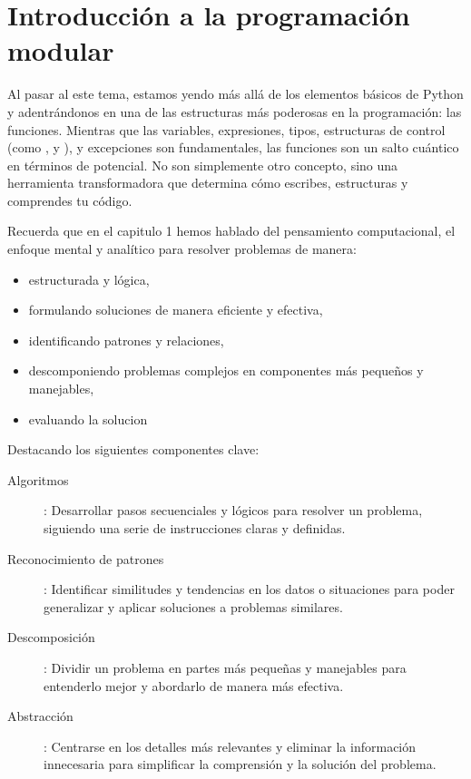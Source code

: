
\section{Introducción a la programación modular}\label{introfunction}

Al pasar al este tema, estamos yendo más allá de los elementos básicos de Python y adentrándonos en una de las estructuras más poderosas en la programación: las funciones. Mientras que las variables, expresiones, tipos, estructuras de control (como ,  y ), y excepciones son fundamentales, las funciones son un salto cuántico en términos de potencial. No son simplemente otro concepto, sino una herramienta transformadora que determina cómo escribes, estructuras y comprendes tu código.

Recuerda que en el capitulo 1 hemos hablado del pensamiento computacional, el enfoque mental y analítico para resolver problemas de manera:

\begin{itemize}
\item estructurada y lógica, 
\item formulando soluciones de manera eficiente y efectiva,
\item identificando patrones y relaciones, 
\item descomponiendo problemas complejos en componentes más pequeños y manejables,
\item evaluando la solucion
\end{itemize}

Destacando los siguientes componentes clave:

\begin{description}
\item[Algoritmos]: Desarrollar pasos secuenciales y lógicos para resolver un problema, siguiendo una serie de instrucciones claras y definidas.

\item[Reconocimiento de patrones]: Identificar similitudes y tendencias en los datos o situaciones para poder generalizar y aplicar soluciones a problemas similares.

\item[Descomposición]: Dividir un problema en partes más pequeñas y manejables para entenderlo mejor y abordarlo de manera más efectiva.

\item[Abstracción]: Centrarse en los detalles más relevantes y eliminar la información innecesaria para simplificar la comprensión y la solución del problema.
\end{description}


